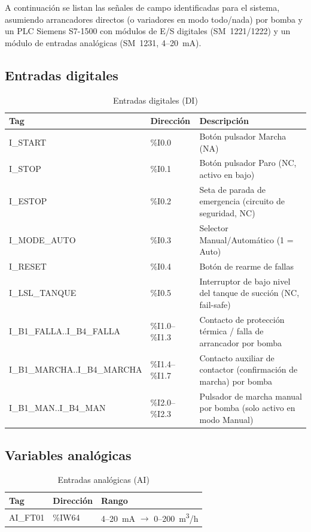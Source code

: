 \documentclass[conference]{IEEEtran}
\begin{document}
A continuación se listan las señales de campo identificadas para el sistema, asumiendo arrancadores directos (o variadores en modo todo/nada) por bomba y un PLC Siemens S7-1500 con módulos de E/S digitales (SM~1221/1222) y un módulo de entradas analógicas (SM~1231, 4--20~mA).

\subsection{Entradas digitales}
\begin{table}[H]
\centering
\caption{Entradas digitales (DI)}
\label{tab:di}
\renewcommand{\arraystretch}{1.2}
\begin{tabular}{|l|l|p{3.6cm}|}
\hline
\textbf{Tag} & \textbf{Dirección} & \textbf{Descripción} \\
\hline
I\_START & \%I0.0 & Botón pulsador Marcha (NA) \\ \hline
I\_STOP & \%I0.1 & Botón pulsador Paro (NC, activo en bajo) \\ \hline
I\_ESTOP & \%I0.2 & Seta de parada de emergencia (circuito de seguridad, NC) \\ \hline
I\_MODE\_AUTO & \%I0.3 & Selector Manual/Automático (1 = Auto) \\ \hline
I\_RESET & \%I0.4 & Botón de rearme de fallas \\ \hline
I\_LSL\_TANQUE & \%I0.5 & Interruptor de bajo nivel del tanque de succión (NC, fail-safe) \\ \hline
I\_B1\_FALLA..I\_B4\_FALLA & \%I1.0--\%I1.3 & Contacto de protección térmica / falla de arrancador por bomba \\ \hline
I\_B1\_MARCHA..I\_B4\_MARCHA & \%I1.4--\%I1.7 & Contacto auxiliar de contactor (confirmación de marcha) por bomba \\ \hline
I\_B1\_MAN..I\_B4\_MAN & \%I2.0--\%I2.3 & Pulsador de marcha manual por bomba (solo activo en modo Manual) \\ \hline
\end{tabular}
\end{table}

\subsection{Variables analógicas}
\begin{table}[H]
\centering
\caption{Entradas analógicas (AI)}
\label{tab:ai}
\renewcommand{\arraystretch}{1.2}
\begin{tabular}{|l|l|l|}
\hline
\textbf{Tag} & \textbf{Dirección} & \textbf{Rango} \\
\hline
AI\_FT01 & \%IW64 & 4--20~mA $\rightarrow$ 0--200~\si{m^3/h} \\
\hline
\end{tabular}
\end{table}
\end{document}
